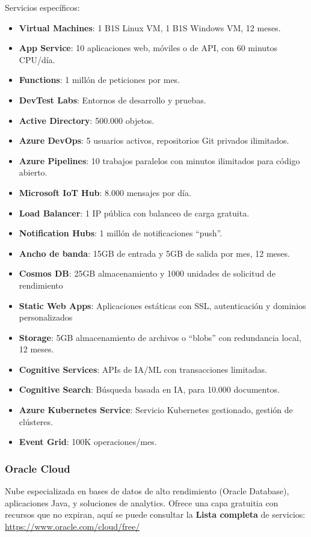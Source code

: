 Servicios específicos:
\begin{itemize}
	\item \textbf{Virtual Machines}: 1 B1S Linux VM, 1 B1S Windows VM, 12 meses.
	\item \textbf{App Service}: 10 aplicaciones web, móviles o de API, con 60 minutos CPU/día.
	\item \textbf{Functions}: 1 millón de peticiones por mes.
	\item \textbf{DevTest Labs}: Entornos de desarrollo y pruebas.
	\item \textbf{Active Directory}: 500.000 objetos.
	\item \textbf{Azure DevOps}: 5 usuarios activos, repositorios Git privados ilimitados.
	\item \textbf{Azure Pipelines}: 10 trabajos paralelos con minutos ilimitados para código abierto.
	\item \textbf{Microsoft IoT Hub}: 8.000 mensajes por día.
	\item \textbf{Load Balancer}: 1 IP pública con balanceo de carga gratuita.
	\item \textbf{Notification Hubs}: 1 millón de notificaciones ``push''.
	\item \textbf{Ancho de banda}: 15GB de entrada y 5GB de salida por mes, 12 meses.
	\item \textbf{Cosmos DB}: 25GB almacenamiento y 1000 unidades de solicitud de rendimiento
	\item \textbf{Static Web Apps}: Aplicaciones estáticas con SSL, autenticación y dominios personalizados
	\item \textbf{Storage}: 5GB almacenamiento de archivos o ``blobs'' con redundancia local, 12 meses.
	\item \textbf{Cognitive Services}: APIs de IA/ML con transacciones limitadas.
	\item \textbf{Cognitive Search}: Búsqueda basada en IA, para 10.000 documentos.
	\item \textbf{Azure Kubernetes Service}: Servicio Kubernetes gestionado, gestión de clústeres.
	\item \textbf{Event Grid}: 100K operaciones/mes.
\end{itemize}

\subsubsection*{Oracle Cloud}

Nube especializada en bases de datos de alto rendimiento (Oracle Database), aplicaciones Java, y soluciones de analytics. Ofrece una capa gratuitia con recursos que no expiran, aquí se puede consultar la \textbf{Lista completa} de servicios: \url{https://www.oracle.com/cloud/free/}

